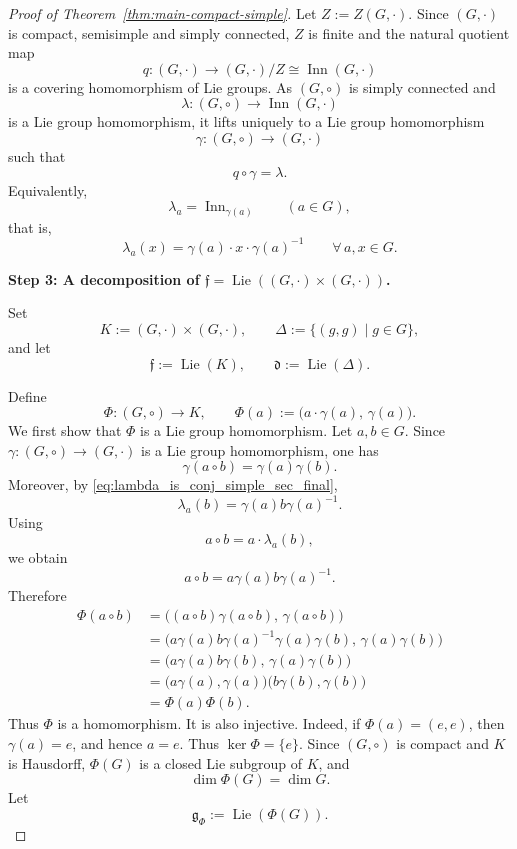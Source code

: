 \documentclass[reqno]{amsart}
\DeclareMathOperator{\Inn}{Inn}
\DeclareMathOperator{\Lie}{Lie}
\begin{document}
\begin{proof}[Proof of Theorem~\ref{thm:main-compact-simple}]
Let \(Z:=Z(G,\cdot)\). Since \((G,\cdot)\) is compact, semisimple and simply
connected, \(Z\) is finite and the natural quotient map
\[
q:(G,\cdot)\longrightarrow (G,\cdot)/Z\cong \Inn(G,\cdot)
\]
is a covering homomorphism of Lie groups. As \((G,\circ)\) is simply connected
and
\[
\lambda:(G,\circ)\to \Inn(G,\cdot)
\]
is a Lie group homomorphism, it lifts uniquely to a Lie group homomorphism
\[
\gamma:(G,\circ)\to (G,\cdot)
\]
such that
\[
q\circ \gamma=\lambda.
\]
Equivalently,
\begin{equation}\label{eq:lambda_is_conj_simple_sec_final}
\lambda_a=\Inn_{\gamma(a)}
\qquad (a\in G),
\end{equation}
that is,
\[
\lambda_a(x)=\gamma(a)\cdot x\cdot \gamma(a)^{-1}
\qquad \forall\, a,x\in G.
\]

\medskip
\noindent
\textbf{Step 3: A decomposition of \(\mathfrak f=\Lie((G,\cdot)\times(G,\cdot))\).}

Set
\[
K:=(G,\cdot)\times (G,\cdot),
\qquad
\Delta:=\{(g,g)\mid g\in G\},
\]
and let
\[
\mathfrak f:=\Lie(K),
\qquad
\mathfrak d:=\Lie(\Delta).
\]

Define
\begin{equation}\label{eq:Phi_def_simple_sec_final}
\Phi:(G,\circ)\longrightarrow K,
\qquad
\Phi(a):=\bigl(a\cdot \gamma(a),\,\gamma(a)\bigr).
\end{equation}
We first show that \(\Phi\) is a Lie group homomorphism. Let \(a,b\in G\). Since
\(\gamma:(G,\circ)\to (G,\cdot)\) is a Lie group homomorphism, one has
\[
\gamma(a\circ b)=\gamma(a)\gamma(b).
\]
Moreover, by \eqref{eq:lambda_is_conj_simple_sec_final},
\[
\lambda_a(b)=\gamma(a)b\gamma(a)^{-1}.
\]
Using
\[
a\circ b=a\cdot \lambda_a(b),
\]
we obtain
\[
a\circ b=a\gamma(a)b\gamma(a)^{-1}.
\]
Therefore
\begin{align*}
\Phi(a\circ b)
&=
\bigl((a\circ b)\gamma(a\circ b),\,\gamma(a\circ b)\bigr)\\
&=
\bigl(a\gamma(a)b\gamma(a)^{-1}\gamma(a)\gamma(b),\,\gamma(a)\gamma(b)\bigr)\\
&=
\bigl(a\gamma(a)b\gamma(b),\,\gamma(a)\gamma(b)\bigr)\\
&=
\bigl(a\gamma(a),\gamma(a)\bigr)\bigl(b\gamma(b),\gamma(b)\bigr)\\
&=
\Phi(a)\Phi(b).
\end{align*}
Thus \(\Phi\) is a homomorphism.
It is also injective. Indeed, if \(\Phi(a)=(e,e)\), then \(\gamma(a)=e\), and
hence \(a=e\). Thus \(\ker\Phi=\{e\}\). Since \((G,\circ)\) is compact and \(K\)
is Hausdorff, \(\Phi(G)\) is a closed Lie subgroup of \(K\), and
\[
\dim \Phi(G)=\dim G.
\]
Let
\[
\mathfrak g_\Phi:=\Lie(\Phi(G)).
\]


\end{proof}
\end{document}
